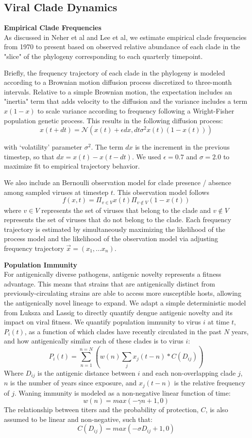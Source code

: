 \documentclass[11pt,oneside,letterpaper]{article}
\begin{document}
\subsection*{Viral Clade Dynamics}

\textbf{Empirical Clade Frequencies}\\
As discussed in Neher et al and Lee et al, we estimate empirical clade frequencies from 1970 to present based on observed relative abundance of each clade in the "slice" of the phylogeny corresponding to each quarterly timepoint.

Briefly, the frequency trajectory of each clade in the phylogeny is modeled according to a Brownian motion diffusion process discretized to three-month intervals.
Relative to a simple Brownian motion, the expectation includes an "inertia" term that adds velocity to the diffusion and the variance includes a term $x(1-x)$ to scale variance according to frequency following a Wright-Fisher population genetic process.
This results in the following diffusion process:
$$x(t+dt) = \mathcal{N}(x(t) + \epsilon dx, dt \sigma^2 x(t) (1-x(t)))$$

with `volatility' parameter $\sigma^2$.
The term $dx$ is the increment in the previous timestep, so that $dx = x(t) - x(t-dt)$.
We used $\epsilon = 0.7$ and $\sigma = 2.0$ to maximize fit to empirical trajectory behavior.

We also include an Bernoulli observation model for clade presence / absence among sampled viruses at timestep $t$.
This observation model follows
$$f(x,t) = \Pi_{v \in V} x(t) \Pi_{v \notin V} (1-x(t))$$
where $v \in V$ represents the set of viruses that belong to the clade and $v \notin V$ represents the set of viruses that do not belong to the clade.
Each frequency trajectory is estimated by simultaneously
maximizing the likelihood of the process model and the likelihood
of the observation model via adjusting frequency trajectory $\vec{x} = (x_1, ... x_n)$.

\textbf{Population Immunity}\\
For antigenically diverse pathogens, antigenic novelty represents a fitness advantage.
This means that strains that are antigenically distinct from previously-circulating strains are able to access more susceptible hosts, allowing the antigenically novel lineage to expand.
We adapt a simple deterministic model from Luksza and Lassig to directly quantify dengue antigenic novelty and its impact on viral fitness.
We quantify population immunity to virus $i$ at time $t$, $P_i(t)$, as a function of which clades have recently circulated in the past $N$ years, and how antigenically similar each of these clades is to virus $i$:
$$P_i(t) = \sum_{n=1}^{n=N} (w(n)  \sum_{j} x_j(t-n) * C( D_{ij}))$$
Where $D_{ij}$ is the antigenic distance between $i$ and each non-overlapping clade $j$, $n$ is the number of years since exposure, and $x_j(t-n)$ is the relative frequency of $j$.
Waning immunity is modeled as a non-negative linear function of time:
$$w(n) = max(-\gamma n + 1, 0)$$
The relationship between titers and the probability of protection, $C$, is also assumed to be linear and non-negative, such that:
$$C(D_{ij}) = max(-\sigma D_{ij} + 1, 0)$$
\end{document}
